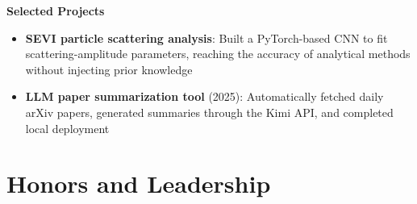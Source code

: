 \documentclass[10pt, a4paper]{article}
\newcommand{\entry}[2]{%
    \vspace{0.1em}
    \noindent\textbf{#1}\hfill{\small\color{graytext}#2}\\[-0.4em]
}
\begin{document}
\entry{Selected Projects}{}
\begin{itemize}
    \item \textbf{SEVI particle scattering analysis}: Built a PyTorch-based CNN to fit scattering-amplitude parameters, reaching the accuracy of analytical methods without injecting prior knowledge
    \item \textbf{LLM paper summarization tool} (2025): Automatically fetched daily arXiv papers, generated summaries through the Kimi API, and completed local deployment
\end{itemize}

\section{Honors and Leadership}
\\[-0.2em]
\end{document}

